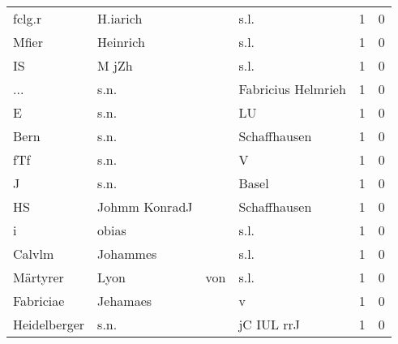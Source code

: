 \begin{tabular}{llllrr}
                   fclg.r &                           H.iarich &             &                                        s.l. &          1 &         0 \\
                    Mfier &                           Heinrich &             &                                        s.l. &          1 &         0 \\
                       IS &                              M jZh &             &                                        s.l. &          1 &         0 \\
                      ... &                               s.n. &             &                          Fabricius Helmrieh &          1 &         0 \\
                        E &                               s.n. &             &                                          LU &          1 &         0 \\
                     Bern &                               s.n. &             &                                Schaffhausen &          1 &         0 \\
                      fTf &                               s.n. &             &                                           V &          1 &         0 \\
                        J &                               s.n. &             &                                       Basel &          1 &         0 \\
                       HS &                      Johmm KonradJ &             &                                Schaffhausen &          1 &         0 \\
                        i &                              obias &             &                                        s.l. &          1 &         0 \\
                   Calvlm &                           Johammes &             &                                        s.l. &          1 &         0 \\
                 Märtyrer &                               Lyon &         von &                                        s.l. &          1 &         0 \\
                Fabriciae &                           Jehamaes &             &                                           v &          1 &         0 \\
             Heidelberger &                               s.n. &             &                                  jC IUL rrJ &          1 &         0 \\

\end{tabular}
